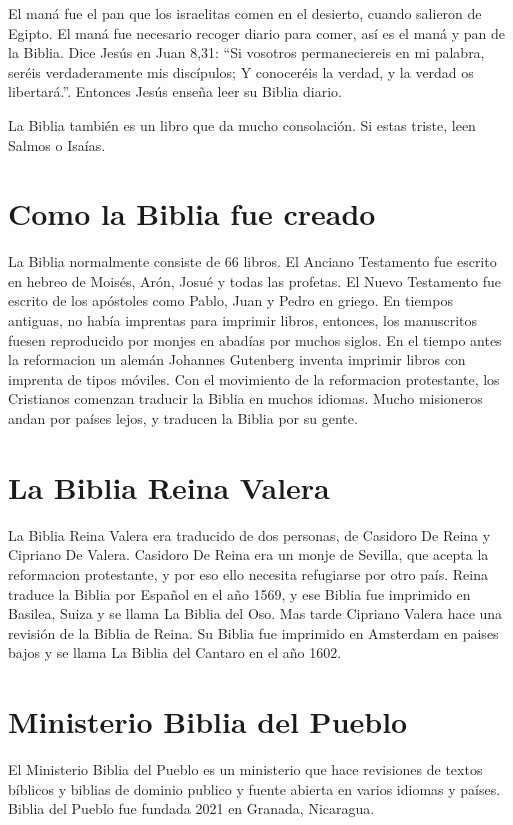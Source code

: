 El maná fue el pan que los israelitas comen en el desierto, cuando
salieron de Egipto. El maná fue necesario recoger diario para comer, así
es el maná y pan de la Biblia. Dice Jesús en Juan 8,31: ``Si vosotros
permaneciereis en mi palabra, seréis verdaderamente mis discípulos; Y
conoceréis la verdad, y la verdad os libertará.''. Entonces Jesús enseña
leer su Biblia diario.

La Biblia también es un libro que da mucho consolación. Si estas triste,
leen Salmos o Isaías.

\hypertarget{como-la-biblia-fue-creado}{%
\section{Como la Biblia fue creado}\label{como-la-biblia-fue-creado}}

La Biblia normalmente consiste de 66 libros. El Anciano Testamento fue
escrito en hebreo de Moisés, Arón, Josué y todas las profetas. El Nuevo
Testamento fue escrito de los apóstoles como Pablo, Juan y Pedro en
griego. En tiempos antiguas, no había imprentas para imprimir libros,
entonces, los manuscritos fuesen reproducido por monjes en abadías por
muchos siglos. En el tiempo antes la reformacion un alemán Johannes
Gutenberg inventa imprimir libros con imprenta de tipos móviles. Con el
movimiento de la reformacion protestante, los Cristianos comenzan
traducir la Biblia en muchos idiomas. Mucho misioneros andan por países
lejos, y traducen la Biblia por su gente.

\hypertarget{la-biblia-reina-valera}{%
\section{La Biblia Reina Valera}\label{la-biblia-reina-valera}}

La Biblia Reina Valera era traducido de dos personas, de Casidoro De
Reina y Cipriano De Valera. Casidoro De Reina era un monje de Sevilla,
que acepta la reformacion protestante, y por eso ello necesita
refugiarse por otro país. Reina traduce la Biblia por Español en el año
1569, y ese Biblia fue imprimido en Basilea, Suiza y se llama La Biblia
del Oso. Mas tarde Cipriano Valera hace una revisión de la Biblia de
Reina. Su Biblia fue imprimido en Amsterdam en paises bajos y se llama
La Biblia del Cantaro en el año 1602.

\hypertarget{ministerio-biblia-del-pueblo}{%
\section{Ministerio Biblia del
Pueblo}\label{ministerio-biblia-del-pueblo}}

El Ministerio Biblia del Pueblo es un ministerio que hace revisiones de
textos bíblicos y biblias de dominio publico y fuente abierta en varios
idiomas y países. Biblia del Pueblo fue fundada 2021 en Granada,
Nicaragua.
